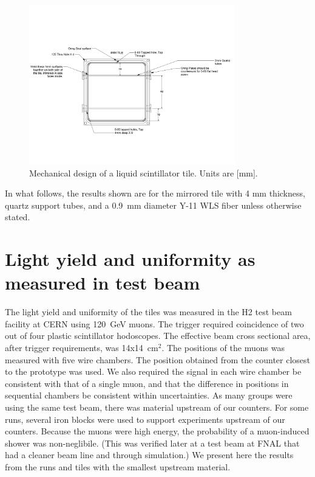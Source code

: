 \documentclass[review]{elsarticle}
\begin{document}
\begin{figure}[!ht]
\begin{center}
\includegraphics[width=0.8\textwidth]{./figures/mechanicaldesign.pdf}
\caption{Mechanical design of a liquid scintillator tile. Units are
  [mm].}
\label{fig:tiledesign}
\end{center}
\end{figure}

In what follows, the results shown are for the mirrored tile with 4 mm
thickness, quartz support tubes, and a 0.9~mm diameter Y-11 WLS fiber
unless otherwise stated.

\section{Light yield and uniformity as measured in test beam}

The light yield and uniformity of the tiles was measured in the H2
test beam facility at CERN using 120~GeV muons. The trigger required
coincidence of two out of four plastic scintillator hodoscopes. The
effective beam cross sectional area, after trigger requirements, was
14x14~cm$^2$. The positions of the muons was measured with five
wire chambers. The position obtained from the counter closest to the
prototype was used. We also required the signal in each wire chamber
be consistent with that of a single muon, and that the difference in
positions in sequential chambers be consistent within uncertainties.
As many groups were using the same test beam, there was material
upstream of our counters. For some runs, several iron blocks were
used to support experiments upstream of our counters. Because the
muons were high energy, the probability of a muon-induced shower was
non-neglibile. (This was verified later at a test beam at FNAL that
had a cleaner beam line and through simulation.) We present here the
results from the runs and tiles with the smallest upstream material.
\end{document}
